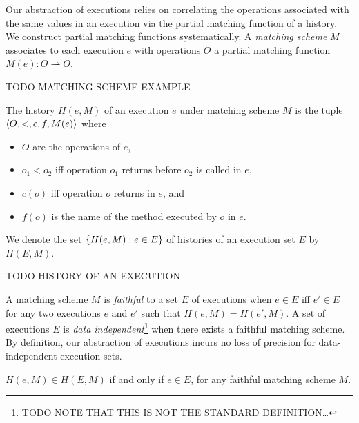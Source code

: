 Our abstraction of executions relies on correlating the operations associated
with the same values in an execution via the partial matching function of a
history. We construct partial matching functions systematically. A
\emph{matching scheme} $M$ associates to each execution $e$ with operations $O$
a partial matching function $M(e): O \rightharpoonup O$.

\begin{example}

  TODO MATCHING SCHEME EXAMPLE

\end{example}

The history $H(e,M)$ of an execution $e$ under matching scheme $M$ is the tuple
${\left\langle{O,<,c,f,M(e)}\right\rangle}$ where
\begin{itemize}

  \item $O$ are the operations of $e$,

  \item $o_1 < o_2$ if{f} operation $o_1$ returns before $o_2$ is called in $e$,

  \item $c(o)$ if{f} operation $o$ returns in $e$, and

  \item $f(o)$ is the name of the method executed by $o$ in $e$.

\end{itemize}
We denote the set ${\{{H(e,M) : e \in E}\}}$ of histories of an execution set $E$
by $H(E,M)$.

\begin{example}

  TODO HISTORY OF AN EXECUTION

\end{example}

A matching scheme $M$ is \emph{faithful} to a set $E$ of executions when $e \in
E$ if{f} $e' \in E$ for any two executions $e$ and $e'$ such that $H(e,M) =
H(e',M)$. A set of executions $E$ is \emph{data independent}\footnote{TODO NOTE
THAT THIS IS NOT THE STANDARD DEFINITION…} when there exists a faithful
matching scheme. By definition, our abstraction of executions incurs no loss of
precision for data-independent execution sets.

\begin{lemma}

  $H(e,M) \in H(E,M)$ if and only if $e \in E$, for any faithful matching
  scheme $M$.

\end{lemma}

